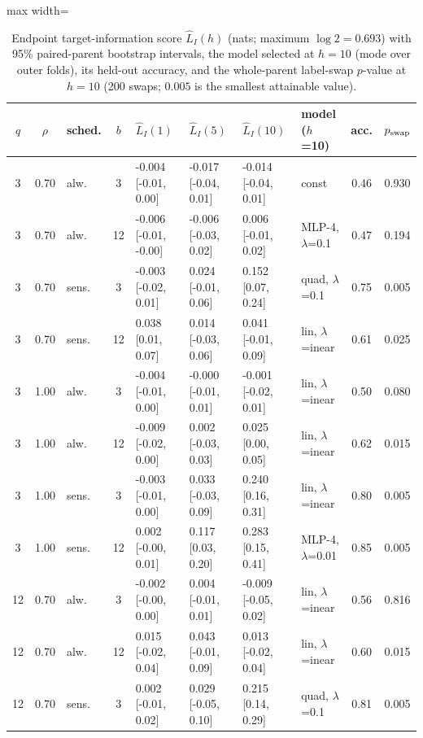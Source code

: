 \begin{table}[htbp]
\centering
\scriptsize
\caption{Endpoint target-information score $\widehat L_I(h)$ (nats; maximum $\log 2=0.693$) with 95\% paired-parent bootstrap intervals, the model selected at $h=10$ (mode over outer folds), its held-out accuracy, and the whole-parent label-swap $p$-value at $h=10$ (200 swaps; $0.005$ is the smallest attainable value).}\label{tab:endpoint}
\begin{adjustbox}{max width=\textwidth}
\begin{tabular}{cclc lll l cc}
\toprule
$q$ & $\rho$ & sched. & $b$ & $\widehat L_I(1)$ & $\widehat L_I(5)$ & $\widehat L_I(10)$ & model ($h$=10) & acc. & $p_{\rm swap}$ \\
\midrule
3 & 0.70 & alw. & 3 & -0.004 [-0.01, 0.00] & -0.017 [-0.04, 0.01] & -0.014 [-0.04, 0.01] & const & 0.46 & 0.930 \\
3 & 0.70 & alw. & 12 & -0.006 [-0.01, -0.00] & -0.006 [-0.03, 0.02] & 0.006 [-0.01, 0.02] & MLP-4, $\lambda$=0.1 & 0.47 & 0.194 \\
3 & 0.70 & sens. & 3 & -0.003 [-0.02, 0.01] & 0.024 [-0.01, 0.06] & 0.152 [0.07, 0.24] & quad, $\lambda$=0.1 & 0.75 & 0.005 \\
3 & 0.70 & sens. & 12 & 0.038 [0.01, 0.07] & 0.014 [-0.03, 0.06] & 0.041 [-0.01, 0.09] & lin, $\lambda$=inear & 0.61 & 0.025 \\
3 & 1.00 & alw. & 3 & -0.004 [-0.01, 0.00] & -0.000 [-0.01, 0.01] & -0.001 [-0.02, 0.01] & lin, $\lambda$=inear & 0.50 & 0.080 \\
3 & 1.00 & alw. & 12 & -0.009 [-0.02, 0.00] & 0.002 [-0.03, 0.03] & 0.025 [0.00, 0.05] & lin, $\lambda$=inear & 0.62 & 0.015 \\
3 & 1.00 & sens. & 3 & -0.003 [-0.01, 0.00] & 0.033 [-0.03, 0.09] & 0.240 [0.16, 0.31] & lin, $\lambda$=inear & 0.80 & 0.005 \\
3 & 1.00 & sens. & 12 & 0.002 [-0.00, 0.01] & 0.117 [0.03, 0.20] & 0.283 [0.15, 0.41] & MLP-4, $\lambda$=0.01 & 0.85 & 0.005 \\
12 & 0.70 & alw. & 3 & -0.002 [-0.00, 0.00] & 0.004 [-0.01, 0.01] & -0.009 [-0.05, 0.02] & lin, $\lambda$=inear & 0.56 & 0.816 \\
12 & 0.70 & alw. & 12 & 0.015 [-0.02, 0.04] & 0.043 [-0.01, 0.09] & 0.013 [-0.02, 0.04] & lin, $\lambda$=inear & 0.60 & 0.015 \\
12 & 0.70 & sens. & 3 & 0.002 [-0.01, 0.02] & 0.029 [-0.05, 0.10] & 0.215 [0.14, 0.29] & quad, $\lambda$=0.1 & 0.81 & 0.005 \\

\end{tabular}
\end{adjustbox}
\end{table}
